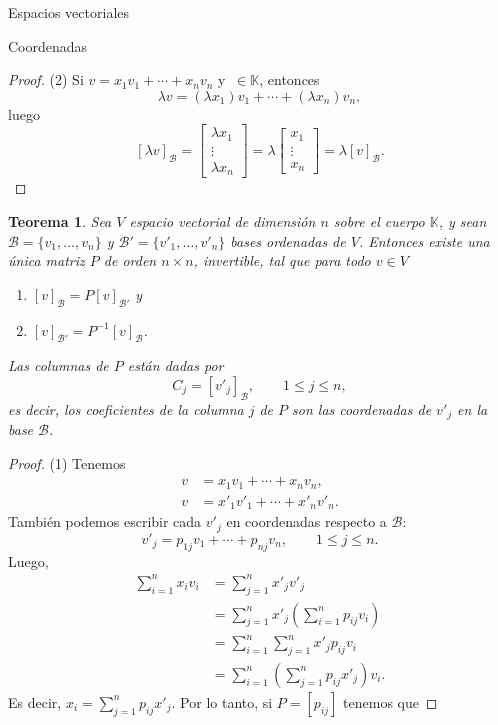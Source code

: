 \documentclass[a4paper,12pt,twoside,spanish]{amsbook}
\newtheorem{teorema}{Teorema}[section]
\theoremstyle{definition}
\theoremstyle{remark}
\newcommand{\K}{\mathbb K}
\begin{document}
\begin{chapter}{Espacios vectoriales}
\begin{section}{Coordenadas}
\begin{proof}
		(2) Si $v = x_1v_1 + \cdots +x_nv_n$ y $\ \in \K$, entonces 
		$$
		\lambda v = (\lambda x_1)v_1 + \cdots +(\lambda x_n)v_n,
		$$
		luego
		$$
		[\lambda v ]_\mathcal{B} = \begin{bmatrix}\lambda x_1 \\ \vdots \\ \lambda x_n\end{bmatrix}
		= \lambda \begin{bmatrix}x_1 \\ \vdots \\ x_n\end{bmatrix} = \lambda [v]_\mathcal{B}.
		$$
	\end{proof}
	
	\begin{teorema}
			Sea $V$  espacio vectorial de dimensión $n$  sobre el cuerpo $\K$, 	y sean $	\mathcal{B} = \{v_1,\ldots,v_n\}$ y $\mathcal{B'} = \{v'_1,\ldots,v'_n\}$ bases ordenadas de $V$. Entonces existe una única matriz $P$ de orden $n \times n$, invertible, tal que para todo $v \in V$
			\begin{enumerate}
				\item $[v]_\mathcal{B} = P[v]_\mathcal{B'}$ y
				\item $[v]_\mathcal{B'} = P^{-1}[v]_\mathcal{B}$.
			\end{enumerate} 
			Las columnas de $P$ están dadas por
			$$
			C_j = [v'_j]_\mathcal{B},\qquad 1 \le j \le n,
			$$
			es decir, los coeficientes de la columna $j$ de $P$ son las coordenadas de $v'_j$ en la base $\mathcal{B}$. 
	\end{teorema}
	\begin{proof} (1) Tenemos
		\begin{align*}
			v &=   x_1v_1 + \cdots +x_nv_n, \\
			v &=  x'_1v'_1 + \cdots +x'_nv'_n.
		\end{align*}
		 También podemos escribir cada $v'_j$ en coordenadas respecto a $\mathcal B$:
		 $$
		 v'_j =  p_{1j}v_1 + \cdots +p_{nj}v_n, \qquad  1 \le j \le n.
		 $$ 
		Luego, 
		\begin{align*}
			 \sum_{i=1}^{n}x_iv_i &=  \sum_{j=1}^{n}x'_jv'_j \\
			&=  \sum_{j=1}^{n}x'_j(\sum_{i=1}^{n}p_{ij}v_i) \\
			&=  \sum_{i=1}^{n}\sum_{j=1}^{n}x'_jp_{ij}v_i \\
			&=  \sum_{i=1}^{n}(\sum_{j=1}^{n}p_{ij}x'_j)v_i.			
		\end{align*}
		Es decir, $x_i = \sum_{j=1}^{n}p_{ij}x'_j$. Por lo tanto, si $P = [p_{ij}]$ tenemos que

\end{proof}
\end{section}
\end{chapter}
\end{document}
